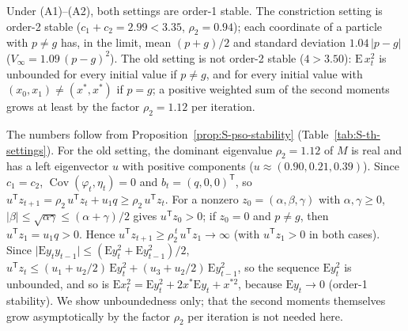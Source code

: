 \begin{thS}
\label{prop:S-settings}
Under (A1)--(A2), both settings are order-1 stable. The constriction setting is order-2 stable ($c_1+c_2=2.99<3.35$, $\rho_2=0.94$); each coordinate of a particle with $p\ne g$ has, in the limit, mean $(p+g)/2$ and standard deviation $1.04\,\lvert p-g\rvert$ ($V_\infty=1.09\,(p-g)^2$). The old setting is not order-2 stable ($4>3.50$): $\mathrm E\,x_t^2$ is unbounded for every initial value if $p\ne g$, and for every initial value with $(x_0,x_1)\ne(x^*,x^*)$ if $p=g$; a positive weighted sum of the second moments grows at least by the factor $\rho_2=1.12$ per iteration.
\end{thS}
\begin{thSproof}
The numbers follow from Proposition~\ref{prop:S-pso-stability} (Table~\ref{tab:S-th-settings}). For the old setting, the dominant eigenvalue $\rho_2=1.12$ of $M$ is real and has a left eigenvector $u$ with positive components ($u\approx(0.90,0.21,0.39)$). Since $c_1=c_2$, $\operatorname{Cov}(\varphi_t,\eta_t)=0$ and $b_t=(q,0,0)^{\mathsf T}$, so $u^{\mathsf T}z_{t+1}=\rho_2\,u^{\mathsf T}z_t+u_1q\ge\rho_2\,u^{\mathsf T}z_t$. For a nonzero $z_0=(\alpha,\beta,\gamma)$ with $\alpha,\gamma\ge0$, $\lvert\beta\rvert\le\sqrt{\alpha\gamma}\le(\alpha+\gamma)/2$ gives $u^{\mathsf T}z_0>0$; if $z_0=0$ and $p\ne g$, then $u^{\mathsf T}z_1=u_1q>0$. Hence $u^{\mathsf T}z_{t+1}\ge\rho_2^{\,t}\,u^{\mathsf T}z_1\to\infty$ (with $u^{\mathsf T}z_1>0$ in both cases). Since $\lvert\mathrm Ey_ty_{t-1}\rvert\le(\mathrm Ey_t^2+\mathrm Ey_{t-1}^2)/2$, $u^{\mathsf T}z_t\le(u_1+u_2/2)\,\mathrm Ey_t^2+(u_3+u_2/2)\,\mathrm Ey_{t-1}^2$, so the sequence $\mathrm Ey_t^2$ is unbounded, and so is $\mathrm Ex_t^2=\mathrm Ey_t^2+2x^*\mathrm Ey_t+x^{*2}$, because $\mathrm Ey_t\to0$ (order-1 stability). We show unboundedness only; that the second moments themselves grow asymptotically by the factor $\rho_2$ per iteration is not needed here.
\end{thSproof}

